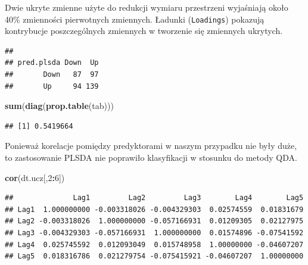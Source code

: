 \documentclass[
]{book}
\newenvironment{Shaded}{\begin{snugshade}}{\end{snugshade}}
\newcommand{\DecValTok}[1]{\textcolor[rgb]{0.00,0.00,0.81}{#1}}
\newcommand{\KeywordTok}[1]{\textcolor[rgb]{0.13,0.29,0.53}{\textbf{#1}}}
\newcommand{\NormalTok}[1]{#1}
\newcommand{\OperatorTok}[1]{\textcolor[rgb]{0.81,0.36,0.00}{\textbf{#1}}}
\newcommand{\StringTok}[1]{\textcolor[rgb]{0.31,0.60,0.02}{#1}}
\theoremstyle{plain}
\theoremstyle{definition}
\theoremstyle{definition}
\theoremstyle{definition}
\theoremstyle{definition}
\theoremstyle{remark}
\begin{document}
Dwie ukryte zmienne użyte do redukcji wymiaru przestrzeni wyjaśniają około 40\% zmienności pierwotnych zmiennych. Ładunki (\texttt{Loadings}) pokazują kontrybucje poszczególnych zmiennych w tworzenie się zmiennych ukrytych.

\begin{Shaded}
\end{Shaded}

\begin{verbatim}
##           
## pred.plsda Down  Up
##       Down   87  97
##       Up     94 139
\end{verbatim}

\begin{Shaded}
\begin{Highlighting}[]
\KeywordTok{sum}\NormalTok{(}\KeywordTok{diag}\NormalTok{(}\KeywordTok{prop.table}\NormalTok{(tab)))}
\end{Highlighting}
\end{Shaded}

\begin{verbatim}
## [1] 0.5419664
\end{verbatim}

Ponieważ korelacje pomiędzy predyktorami w naszym przypadku nie były duże, to zastosowanie PLSDA nie poprawiło klasyfikacji w stosunku do metody QDA.

\begin{Shaded}
\begin{Highlighting}[]
\KeywordTok{cor}\NormalTok{(dt.ucz[,}\DecValTok{2}\OperatorTok{:}\DecValTok{6}\NormalTok{])}
\end{Highlighting}
\end{Shaded}

\begin{verbatim}
##              Lag1         Lag2         Lag3        Lag4        Lag5
## Lag1  1.000000000 -0.003318026 -0.004329303  0.02574559  0.01831679
## Lag2 -0.003318026  1.000000000 -0.057166931  0.01209305  0.02127975
## Lag3 -0.004329303 -0.057166931  1.000000000  0.01574896 -0.07541592
## Lag4  0.025745592  0.012093049  0.015748958  1.00000000 -0.04607207
## Lag5  0.018316786  0.021279754 -0.075415921 -0.04607207  1.00000000
\end{verbatim}
\end{document}
